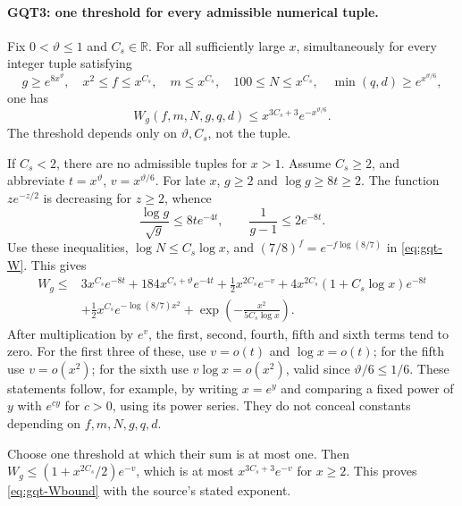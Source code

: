 \paragraph{GQT3: one threshold for every admissible numerical tuple.}
\label{claim:GQT3}
Fix $0<\vartheta\le1$ and $C_s\in\mathbb R$. For all sufficiently
large $x$, simultaneously for every integer tuple satisfying
\begin{equation}\label{eq:gqt-sizes}
 g\ge e^{8x^\vartheta},\quad x^2\le f\le x^{C_s},\quad
 m\le x^{C_s},\quad100\le N\le x^{C_s},\quad
 \min(q,d)\ge e^{x^{\vartheta/6}},
\end{equation}
one has
\begin{equation}\label{eq:gqt-Wbound}
         W_g(f,m,N,g,q,d)
       \le x^{3C_s+3}e^{-x^{\vartheta/6}}.
\end{equation}
The threshold depends only on $\vartheta,C_s$, not the tuple.

If $C_s<2$, there are no admissible tuples for $x>1$. Assume
$C_s\ge2$, and abbreviate $t=x^\vartheta$, $v=x^{\vartheta/6}$.
For late $x$, $g\ge2$ and $\log g\ge8t\ge2$.
The function $z e^{-z/2}$ is decreasing for $z\ge2$, whence
\[
 \frac{\log g}{\sqrt g}\le8t e^{-4t},\qquad
 \frac1{g-1}\le2e^{-8t}.
\]
Use these inequalities, $\log N\le C_s\log x$,
and $(7/8)^f=e^{-f\log(8/7)}$ in \eqref{eq:gqt-W}. This gives
\begin{align*}
 W_g\le{}&3x^{C_s}e^{-8t}
       +184x^{C_s+\vartheta}e^{-4t}
       +\tfrac12x^{2C_s}e^{-v}
       +4x^{2C_s}(1+C_s\log x)e^{-8t}\\
       &+\tfrac12x^{C_s}e^{-\log(8/7)x^2}
       +\exp\left(-\frac{x^2}{5C_s\log x}\right).
\end{align*}
After multiplication by $e^v$, the first, second, fourth, fifth
and sixth terms tend to zero. For the first three of these, use
$v=o(t)$ and $\log x=o(t)$; for the fifth use $v=o(x^2)$;
for the sixth use $v\log x=o(x^2)$, valid since
$\vartheta/6\le1/6$. These statements follow, for example, by
writing $x=e^y$ and comparing a fixed power of $y$ with
$e^{cy}$ for $c>0$, using its power series. They do not conceal
constants depending on $f,m,N,g,q,d$.

Choose one threshold at which their sum is at most one. Then
$W_g\le(1+x^{2C_s}/2)e^{-v}$, which is at most
$x^{3C_s+3}e^{-v}$ for $x\ge2$. This proves
\eqref{eq:gqt-Wbound} with the source's stated exponent.

